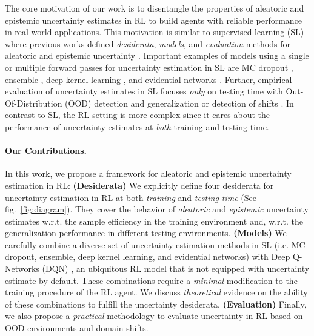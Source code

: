 The core motivation of our work is to disentangle the properties of aleatoric and epistemic uncertainty estimates in RL to build agents with reliable performance in real-world applications. This motivation is similar to supervised learning (SL) where previous works defined \emph{desiderata}, \emph{models}, and \emph{evaluation} methods for aleatoric and epistemic uncertainty \cite{uncertainty-deep-learning, review-uncertainty-dl, dataset-shift, robustness-uncertainty-dirichlet}. Important examples of models using a single or multiple forward passes for uncertainty estimation in SL are MC dropout \cite{dropout}, ensemble \cite{ensembles, hyper-ensembles, batch-ensembles}, deep kernel learning \cite{simple-baseline-uncertainty, due, duq, uceloss}, and evidential networks \cite{postnet, priornet, natpn, evidential-regression}. Further, empirical evaluation of uncertainty estimates in SL focuses \emph{only} on testing time with Out-Of-Distribution (OOD) detection and generalization or detection of shifts \citep{dataset-shift, shifts-dataset}. In contrast to SL, the RL setting is more complex since it cares about the performance of uncertainty estimates at \emph{both} training and testing time.

\paragraph{Our Contributions.} In this work, we propose a framework for aleatoric and epistemic uncertainty estimation in RL: \textbf{(Desiderata)} We explicitly define four desiderata for uncertainty estimation in RL at both \emph{training} and \emph{testing time} (See fig.~\ref{fig:diagram}). They cover the behavior of \emph{aleatoric} and \emph{epistemic} uncertainty estimates w.r.t. the sample efficiency in the training environment and, w.r.t. the generalization performance in different testing environments. \textbf{(Models)} We carefully combine a diverse set of uncertainty estimation methods in SL (i.e. MC dropout, ensemble, deep kernel learning, and evidential networks) with Deep Q-Networks (DQN) \cite{dqn}, an ubiquitous RL model that is not equipped with uncertainty estimate by default. These combinations require a \emph{minimal} modification to the training procedure of the RL agent. We discuss \emph{theoretical} evidence on the ability of these combinations to fulfill the uncertainty desiderata. \textbf{(Evaluation)} Finally, we also propose a \emph{practical} methodology to evaluate uncertainty in RL based on OOD environments and domain shifts.

